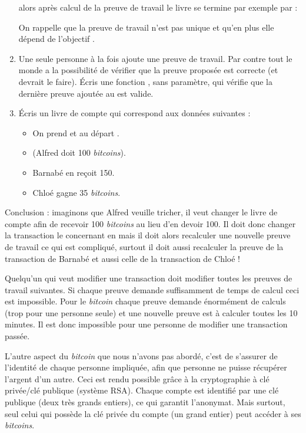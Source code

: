 \documentclass[11pt,class=report,crop=false]{standalone}
\begin{document}
\begin{activite}
\begin{enumerate}
  alors après calcul de la preuve de travail le livre se termine par exemple par :  
  
     On rappelle que la preuve de travail n'est pas unique et qu'en plus elle dépend 
   de l'objectif .
   
   \item Une seule personne à la fois ajoute une preuve de travail. Par contre tout le monde a la possibilité de vérifier que la preuve proposée est correcte (et devrait le faire). 
	Écris une fonction , sans paramètre, qui vérifie que la dernière preuve ajoutée au  est valide.
	
	\item Écris un livre de compte qui correspond aux données suivantes :
	\begin{itemize}
	  \item On prend  et au départ .
	  \item {} (Alfred doit 100 \emph{bitcoins}).
	  \item Barnabé en reçoit 150.
	  \item Chloé gagne 35 \emph{bitcoins}.
	\end{itemize}

\end{enumerate} 

Conclusion : imaginons que Alfred veuille tricher, il veut changer le livre de compte afin de recevoir 100 \emph{bitcoins} au lieu d'en devoir 100. Il doit donc changer la transaction le concernant en  mais il doit alors recalculer une nouvelle preuve de travail ce qui est compliqué, surtout il doit aussi recalculer la preuve de la transaction de Barnabé et aussi celle de la transaction de Chloé ! 

Quelqu'un qui veut modifier une transaction doit modifier toutes les preuves de travail suivantes. Si chaque preuve demande suffisamment de temps de calcul ceci est impossible. Pour le \emph{bitcoin} chaque preuve demande énormément de calculs (trop pour une personne seule) et une nouvelle preuve est à calculer toutes les 10 minutes. Il est donc impossible pour une personne de modifier une transaction passée.

\end{activite}


L'autre aspect du \emph{bitcoin} que nous n'avons pas abordé, c'est de s'assurer de l'identité de chaque personne impliquée, afin que personne ne puisse récupérer l'argent d'un autre. Ceci est rendu possible grâce à la cryptographie à clé privée/clé publique (système RSA). Chaque compte est identifié par une clé publique (deux très grands entiers), ce qui garantit l'anonymat. Mais surtout, seul celui qui possède la clé privée du compte (un grand entier) peut accéder à ses \emph{bitcoins}.
\end{document}
